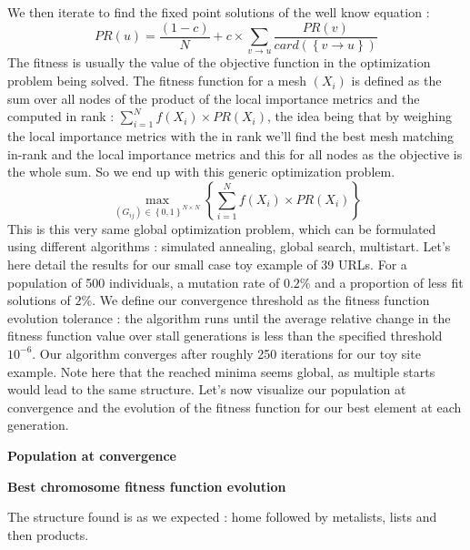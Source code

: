 \documentclass{iSWAGArticle}
\begin{document}
We then iterate to find the fixed point solutions of the well know equation :
\begin{equation}
PR\left(u\right)= \frac{\left(1-c\right)}{N} + c \times \sum_{v \rightarrow u}\frac{PR\left(v\right)}{card\left(\left\{v\rightarrow u\right\}\right)}
\end{equation}
The fitness is usually the value of the objective function in the optimization problem being solved.
The fitness function for a mesh $\left(X_i\right)$ is defined as the sum over all nodes of the product of the local importance metrics
and the computed in rank : $\sum^{N}_{i=1} f\left(X_i\right)\times PR(X_i)$, the idea being that by weighing the local importance metrics with the in rank
we'll find the best mesh matching in-rank and the local importance metrics and this for all nodes as the objective is the whole sum. 
So we end up with this generic optimization problem.
\begin{equation}
\max_{\left(G_{ij}\right)  \in \left\{0,1\right\}^{N\times N}}\left\{ \sum^{N}_{i=1} f\left(X_i\right)\times PR(X_i)\right\}
\end{equation}
This is this very same global optimization problem, which can be formulated using different algorithms : simulated annealing, global search, multistart.
Let's here detail the results for our small case toy example of 39 URLs.
For a population of 500 individuals, a mutation rate of $0.2 \%$ and a proportion of less fit solutions of $2\%$.
We define our convergence threshold as the fitness function evolution tolerance : the algorithm runs until the average relative change in the fitness function value over stall generations is less than the specified 
threshold $10^{-6}$.
Our algorithm converges after roughly 250 iterations for our toy site example. Note here that the reached minima seems global, as multiple starts
would lead to the same structure.
Let's now visualize our population at convergence and the evolution of the fitness function for our best element at each generation.
\begin{center}
\textbf{\large Population at convergence}
\end{center}
\begin{center}
\end{center}
\begin{center}
\textbf{\large Best chromosome fitness function evolution}
\end{center}
\begin{center}
\end{center}
The structure found is as we expected : home followed by metalists, lists and then products.
\end{document}
